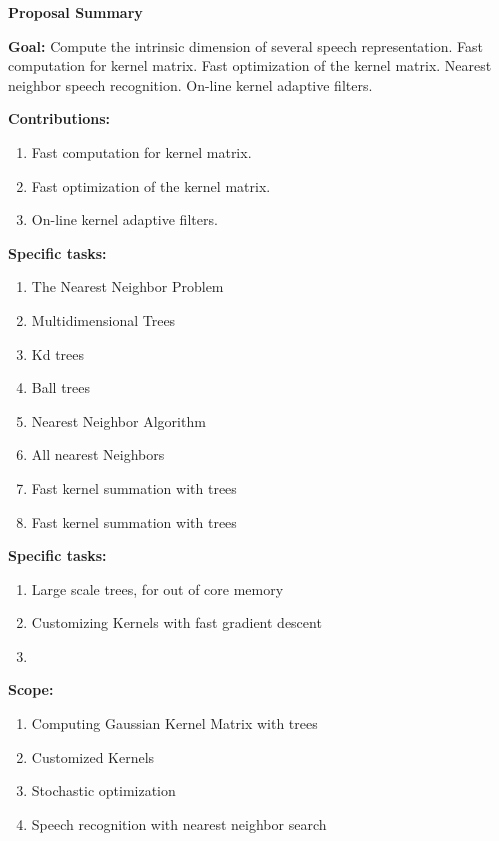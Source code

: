 \documentclass[12pt]{article}
\begin{document}
\pagestyle{plain}
\begin{center}
    \textbf{Proposal Summary}
\end{center}

\textbf{Goal:} Compute the intrinsic dimension of several speech
representation. Fast computation for kernel matrix. Fast
optimization of the kernel matrix. Nearest neighbor speech
recognition. On-line kernel adaptive filters.

\textbf{Contributions:}
\begin{enumerate}
  \item Fast computation for kernel matrix.
  \item Fast optimization of the kernel matrix.
  \item On-line kernel adaptive filters.
\end{enumerate}

\textbf{Specific tasks:}
\begin{enumerate}
  \item The Nearest Neighbor Problem
  \item Multidimensional Trees
  \item Kd trees
  \item Ball trees
  \item Nearest Neighbor Algorithm
  \item All nearest Neighbors
  \item Fast kernel summation with trees
  \item Fast kernel summation with trees
\end{enumerate}

\textbf{Specific tasks:}
\begin{enumerate}
  \item Large scale trees, for out of core memory
  \item Customizing Kernels with fast gradient descent
  \item
\end{enumerate}

\textbf{Scope:}
\begin{enumerate}
  \item Computing Gaussian Kernel Matrix with trees
  \item Customized Kernels
  \item Stochastic optimization
  \item Speech recognition with nearest neighbor search
\end{enumerate}
\end{document}

